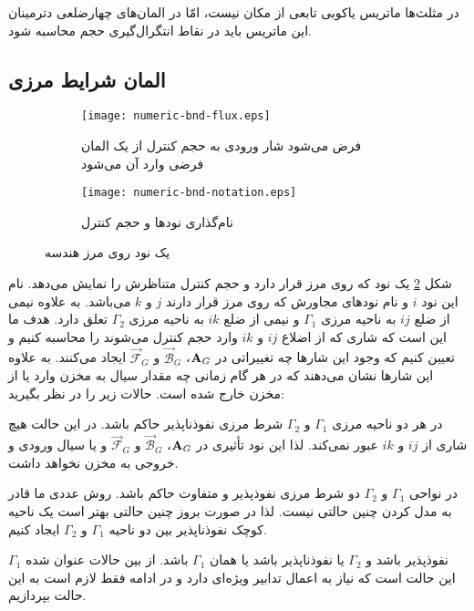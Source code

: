 در مثلث‌ها ماتریس یاکوبی تابعی از مکان نیست، امّا در المان‌های چهارضلعی دترمینان این ماتریس باید در نقاط انتگرال‌گیری حجم محاسبه شود.

\subsection{المان شرایط مرزی}
\begin{figure}
\begin{subfigure}{.5\textwidth}
\texttt{[image: numeric-bnd-flux.eps]} 
\caption{فرض می‌شود شار ورودی به حجم کنترل از یک المان فرضی وارد آن می‌شود}
\label{fig:3bnd-imaj}
\end{subfigure}
\begin{subfigure}{0.5\textwidth}
\texttt{[image: numeric-bnd-notation.eps]} 
\caption{نام‌گذاری نودها و حجم کنترل}
\label{fig:3bnd-real}
\end{subfigure}
\caption{یک نود روی مرز هندسه}
\label{fig:3bnd}
\end{figure}

شکل \ref{fig:3bnd-real} یک نود که روی مرز قرار دارد و حجم کنترل متناظرش را نمایش می‌دهد. نام این نود $i$ و نام نود‌های مجاورش که روی مرز قرار دارند $j$ و $k$ می‌باشد. به علاوه نیمی از ضلع $ij$ به ناحیه مرزی $\Gamma_1$ و نیمی  از ضلع $ik$ به ناحیه مرزی $\Gamma_2$ تعلق دارد. هدف ما این است که شاری که از اضلاع $ij$ و $ik$ وارد حجم کنترل می‌شوند را محاسبه کنیم و تعیین کنیم که وجود این شار‌ها چه تغییراتی در
 $\textbf A_G$، $\vec{\mathcal B}_G$ و $\vec{\mathcal F}_G$
ایجاد می‌کنند. به علاوه  این شار‌ها نشان می‌دهند که در هر گام زمانی چه مقدار سیال به مخزن وارد یا از مخزن خارج شده است. حالات زیر را در نظر بگیرید:
\begin{tight_enumerate}
\item در هر دو ناحیه مرزی $\Gamma_1$ و $\Gamma_2$ شرط مرزی نفوذناپذیر حاکم باشد. در این حالت هیچ شاری از $ij$ و $ik$ عبور نمی‌کند. لذا این نود تأثیری در $\textbf A_G$، $\vec{\mathcal B}_G$ و $\vec{\mathcal F}_G$ و یا سیال ورودی و خروجی به مخزن نخواهد داشت.

\item در نواحی $\Gamma_1$ و $\Gamma_2$ دو شرط مرزی نفوذپذیر و متفاوت حاکم باشد. روش عددی ما قادر به مدل کردن چنین حالتی نیست. لذا در صورت بروز چنین حالتی بهتر است یک ناحیه کوچک نفوذناپذیر بین دو ناحیه $\Gamma_1$ و $\Gamma_2$ ایجاد کنیم.

\item $\Gamma_1$ نفوذپذیر باشد و $\Gamma_2$ یا نفوذناپذیر باشد یا همان $\Gamma_1$ باشد. از بین حالات عنوان شده این حالت است که نیاز به اعمال تدابیر ویژه‌ای دارد و در ادامه فقط لازم است به این حالت بپردازیم.
\end{tight_enumerate}

